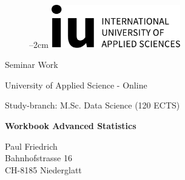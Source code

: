 
\label{titlePage}
\begin{figure}[h]
\centering
\advance\leftskip--2cm
\includegraphics[width=0.50\textwidth]{pics/logo.pdf}
\end{figure}
\FloatBarrier

\begin{Large} 
\begin{center}
Seminar Work
\end{center}
\end{Large} 

\vspace*{5mm}

\begin{large} 
\begin{center}
University of Applied Science - Online
\end{center}
\end{large} 

\begin{large} 
\begin{center}
Study-branch: M.Sc. Data Science (120 ECTS)
\end{center}
\end{large}

\vspace*{15mm}

\begin{Large} 
\begin{center}
\textbf{Workbook Advanced Statistics}
\end{center}
\end{Large}

\vspace*{15mm}

\begin{large} 
\begin{center}
Paul Friedrich\\
Bahnhofstrasse 16\\
CH-8185 Niederglatt
\end{center}
\end{large} 

\vspace*{-6mm}

